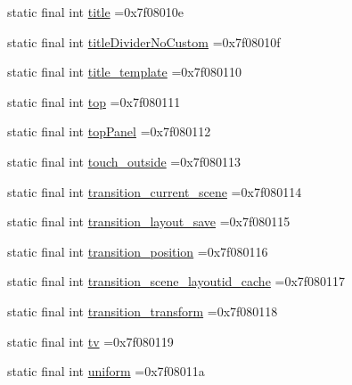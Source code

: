 \begin{DoxyCompactItemize}
\item 
static final int \mbox{\hyperlink{classcom_1_1example_1_1trainawearapplication_1_1_r_1_1id_aa4b47716890b9599739141933f5fc2c5}{title}} =0x7f08010e
\item 
static final int \mbox{\hyperlink{classcom_1_1example_1_1trainawearapplication_1_1_r_1_1id_ad2802f3f791b9d80961881d733d9484c}{title\+Divider\+No\+Custom}} =0x7f08010f
\item 
static final int \mbox{\hyperlink{classcom_1_1example_1_1trainawearapplication_1_1_r_1_1id_adbd36ae57dac5c40c1654f9ac7895880}{title\+\_\+template}} =0x7f080110
\item 
static final int \mbox{\hyperlink{classcom_1_1example_1_1trainawearapplication_1_1_r_1_1id_ac9e9e40b5b2073e1c3daccdd7480ee8c}{top}} =0x7f080111
\item 
static final int \mbox{\hyperlink{classcom_1_1example_1_1trainawearapplication_1_1_r_1_1id_ad170d83dc6c8b44e99ad69d6e301b2d2}{top\+Panel}} =0x7f080112
\item 
static final int \mbox{\hyperlink{classcom_1_1example_1_1trainawearapplication_1_1_r_1_1id_a44e58c6b86baf9d7ee6d74f46c9ee1e8}{touch\+\_\+outside}} =0x7f080113
\item 
static final int \mbox{\hyperlink{classcom_1_1example_1_1trainawearapplication_1_1_r_1_1id_ace1214861f4913873a875a3060e4fb9b}{transition\+\_\+current\+\_\+scene}} =0x7f080114
\item 
static final int \mbox{\hyperlink{classcom_1_1example_1_1trainawearapplication_1_1_r_1_1id_ae49568f59f11ea295e9d90e7bab9f804}{transition\+\_\+layout\+\_\+save}} =0x7f080115
\item 
static final int \mbox{\hyperlink{classcom_1_1example_1_1trainawearapplication_1_1_r_1_1id_a7db5a296f0f066e6598cf89c7eb09c2d}{transition\+\_\+position}} =0x7f080116
\item 
static final int \mbox{\hyperlink{classcom_1_1example_1_1trainawearapplication_1_1_r_1_1id_a9e1a23cdc8bf8a57d93bac006d1fc228}{transition\+\_\+scene\+\_\+layoutid\+\_\+cache}} =0x7f080117
\item 
static final int \mbox{\hyperlink{classcom_1_1example_1_1trainawearapplication_1_1_r_1_1id_a09558ce7ddbc3c90d598345cb3966000}{transition\+\_\+transform}} =0x7f080118
\item 
static final int \mbox{\hyperlink{classcom_1_1example_1_1trainawearapplication_1_1_r_1_1id_a7c4ee790f77ab553b120187d728240d6}{tv}} =0x7f080119
\item 
static final int \mbox{\hyperlink{classcom_1_1example_1_1trainawearapplication_1_1_r_1_1id_ab288b1f0b8613b56498a98379b168caf}{uniform}} =0x7f08011a

\end{DoxyCompactItemize}
